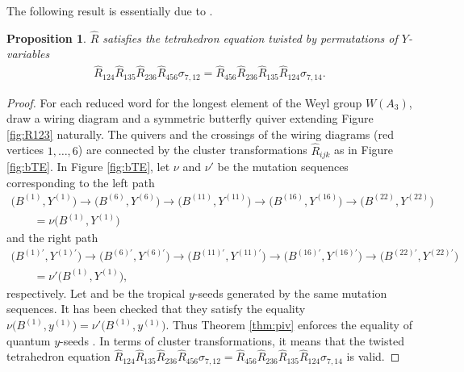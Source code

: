 \documentclass[11pt]{article}
\numberwithin{equation}{section}
\numberwithin{equation}{section}
\newtheorem{Proposition}[Theorem]{Proposition}
 { \theoremstyle{definition}
\newtheorem{Example}[Theorem]{Example}
\newtheorem{Remark}[Theorem]{Remark} }
\begin{document}
The following result is essentially due to \cite{SY22}.
\begin{Proposition}\label{pr:sy}
$\widehat{R}$ satisfies the tetrahedron equation twisted by permutations of $Y$-variables
\begin{align}\label{TE1}
\widehat{R} _{124}\widehat{R} _{135}\widehat{R} _{236} \widehat{R} _{456}\sigma_{7,12}=
\widehat{R} _{456}\widehat{R} _{236}\widehat{R} _{135}\widehat{R} _{124}\sigma_{7,14} .
\end{align}
\end{Proposition}
\begin{proof}
 For each reduced word for the longest element of the Weyl group
 $W(A_3)$, draw a wiring diagram and a symmetric butterfly quiver
 extending Figure \ref{fig:R123} naturally. The quivers and the
 crossings of the wiring diagrams (red vertices $1, \dots, 6$) are
 connected by the cluster transformations $\widehat{R}_{ijk}$ as in
 Figure \ref{fig:bTE}. %
In Figure \ref{fig:bTE},
let $\nu$ and $\nu'$ be the mutation sequences corresponding to the left path
\begin{gather*}
\bigl(B^{(1)},Y^{(1)}\bigr) \rightarrow
\bigl(B^{(6)},Y^{(6)}\bigr) \rightarrow
\bigl(B^{(11)},Y^{(11)}\bigr) \rightarrow
\bigl(B^{(16)},Y^{(16)}\bigr) \rightarrow
\bigl(B^{(22)},Y^{(22)}\bigr)\\
\qquad=\nu\bigl(B^{(1)},Y^{(1)}\bigr)
\end{gather*}
and the right path
\begin{gather*}
\bigl(B^{(1)\prime},Y^{(1)\prime}\bigr) \rightarrow
\bigl(B^{(6)\prime},Y^{(6)\prime}\bigr) \rightarrow
\bigl(B^{(11)\prime},Y^{(11)\prime}\bigr) \rightarrow
\bigl(B^{(16)\prime},Y^{(16)\prime}\bigr) \rightarrow
 \bigl(B^{(22)\prime},Y^{(22)\prime}\bigr)\\
 \qquad=\nu'\bigl(B^{(1)},Y^{(1)}\bigr),
\end{gather*}
 respectively.
Let  and  be the
tropical $y$-seeds generated by the same mutation sequences.
It has been checked \cite[Section~A.2]{SY22}
that they satisfy the equality
$\nu\bigl(B^{(1)},y^{(1)}\bigr)= \nu'\bigl(B^{(1)},y^{(1)}\bigr)$.
Thus Theorem \ref{thm:piv} enforces the equality of quantum $y$-seeds
.
In terms of cluster transformations, it means that the twisted tetrahedron equation
$\widehat{R}_{124}\widehat{R}_{135}\widehat{R}_{236}\widehat{R}_{456}\sigma_{7,12}
=\widehat{R}_{456}\widehat{R}_{236}\widehat{R}_{135}\widehat{R}_{124} \sigma_{7,14}$ is valid.
\end{proof}
\end{document}
